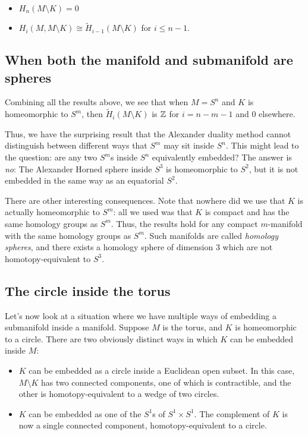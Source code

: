 \documentclass[a4paper]{amsart}
\begin{document}
\begin{itemize}

\item $H_n(M \setminus K) = 0$

\item $H_i(M, M \setminus K) \cong \tilde{H}_{i-1}(M \setminus K)$ for
  $i \le n-1$.

\end{itemize}

\subsection{When both the manifold and submanifold are spheres}

Combining all the results above, we see that when $M = S^n$ and $K$ is
homeomorphic to $S^m$, then $\tilde{H}_i(M \setminus K)$ is $\mathbb{Z}$ for
$i = n - m - 1$ and $0$ elsewhere.

Thus, we have the surprising result that the Alexander duality method
cannot distinguish between different ways that $S^m$ may sit inside
$S^n$. This might lead to the question: are any two $S^m$s inside
$S^n$ equivalently embedded? The answer is {\em no}: The Alexander
Horned sphere inside $S^3$ is homeomorphic to $S^2$, but it is not
embedded in the same way as an equatorial $S^2$.

There are other interesting consequences. Note that nowhere did we use
that $K$ is actually homeomorphic to $S^m$: all we used was that $K$
is compact and has the same homology groups as $S^m$. Thus, the
results hold for any compact $m$-manifold with the same homology
groups as $S^m$. Such manifolds are called {\em homology spheres}, and
there exists a homology sphere of dimension $3$ which are not
homotopy-equivalent to $S^3$.

\subsection{The circle inside the torus}

Let's now look at a situation where we have multiple ways of embedding
a submanifold inside a manifold. Suppose $M$ is the torus, and $K$ is
homeomorphic to a circle. There are two obviously distinct ways in
which $K$ can be embedded inside $M$:

\begin{itemize}

\item $K$ can be embedded as a circle inside a Euclidean open subset. In
  this case, $M \setminus K$ has two connected components, one of
  which is contractible, and the other is homotopy-equivalent to a
  wedge of two circles.

\item $K$ can be embedded as one of the $S^1$s of $S^1 \times
  S^1$. The complement of $K$ is now a single connected component,
  homotopy-equivalent to a circle.

\end{itemize}
\end{document}
